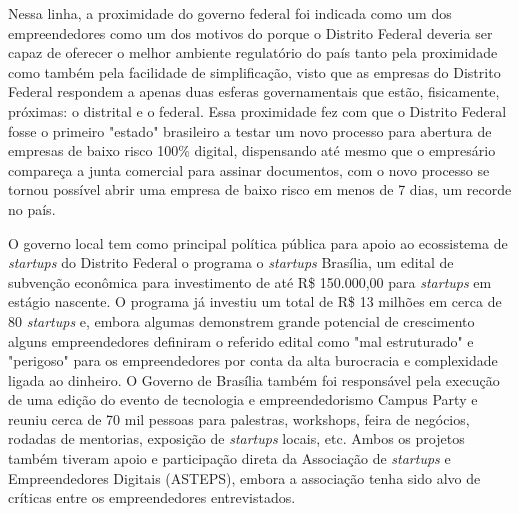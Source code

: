 Nessa linha, a proximidade do governo federal foi indicada como um dos empreendedores como um dos motivos do porque o Distrito Federal deveria ser capaz de oferecer o melhor ambiente regulatório do país tanto pela proximidade como também pela facilidade de simplificação, visto que as empresas do Distrito Federal respondem a apenas duas esferas governamentais que estão, fisicamente, próximas: o  distrital e o federal. Essa proximidade fez com que o Distrito Federal fosse o primeiro "estado" brasileiro a testar um novo processo para abertura de empresas de baixo risco 100\% digital, dispensando até mesmo que o empresário compareça a junta comercial para assinar documentos, com o novo processo se tornou possível abrir uma empresa de baixo risco em menos de 7 dias, um recorde no país.

O governo local tem como principal política pública para apoio ao ecossistema de \textit{startups} do Distrito Federal o programa o \textit{startups} Brasília, um edital de subvenção econômica para investimento de até R\$ 150.000,00 para \textit{startups} em estágio nascente. O programa já investiu um total de R\$ 13 milhões em cerca de 80 \textit{startups} e, embora algumas demonstrem grande potencial de crescimento alguns empreendedores definiram o referido edital como "mal estruturado" e "perigoso" para os empreendedores por conta da alta burocracia e complexidade ligada ao dinheiro. O Governo de Brasília também foi responsável pela execução de uma edição do evento de tecnologia e empreendedorismo Campus Party e reuniu cerca de 70 mil pessoas para palestras, workshops, feira de negócios, rodadas de mentorias, exposição de \textit{startups} locais, etc. Ambos os projetos também tiveram apoio e participação direta da Associação de \textit{startups} e Empreendedores Digitais (ASTEPS), embora a associação tenha sido alvo de críticas entre os empreendedores entrevistados.

